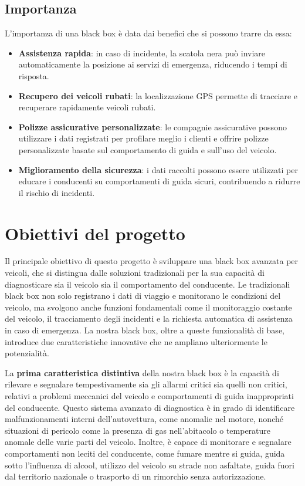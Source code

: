 \documentclass[12pt, a4paper, italian]{report}
\numberwithin{figure}{chapter}
\numberwithin{table}{chapter}
\begin{document}
\subsection{Importanza}
L'importanza di una black box è data dai benefici che si possono trarre da essa: 
\begin{itemize}
    \item \textbf{Assistenza rapida}: in caso di incidente, la scatola nera può inviare automaticamente la posizione ai servizi di emergenza, riducendo i tempi di risposta.
    \item \textbf{Recupero dei veicoli rubati}: la localizzazione GPS permette di tracciare e recuperare rapidamente veicoli rubati.
    \item \textbf{Polizze assicurative personalizzate}: le compagnie assicurative possono utilizzare i dati registrati per profilare meglio i clienti e offrire polizze personalizzate basate sul comportamento di guida e sull'uso del veicolo.
    \item \textbf{Miglioramento della sicurezza}: i dati raccolti possono essere utilizzati per educare i conducenti su comportamenti di guida sicuri, contribuendo a ridurre il rischio di incidenti.
\end{itemize}
\section{Obiettivi del progetto}
Il principale obiettivo di questo progetto è sviluppare una black box avanzata per veicoli, che si distingua dalle soluzioni tradizionali per la sua capacità di diagnosticare sia il veicolo sia il comportamento del conducente. Le tradizionali black box non solo registrano i dati di viaggio e monitorano le condizioni del veicolo, ma svolgono anche funzioni fondamentali come il monitoraggio costante del veicolo, il tracciamento degli incidenti e la richiesta automatica di assistenza in caso di emergenza. La nostra black box, oltre a queste funzionalità di base, introduce due caratteristiche innovative che ne ampliano ulteriormente le potenzialità.

La \textbf{prima caratteristica distintiva} della nostra black box è la capacità di rilevare e segnalare tempestivamente sia gli allarmi critici sia quelli non critici, relativi a problemi meccanici del veicolo e comportamenti di guida inappropriati del conducente. Questo sistema avanzato di diagnostica è in grado di identificare malfunzionamenti interni dell’autovettura, come anomalie nel motore, nonché situazioni di pericolo come la presenza di gas nell'abitacolo o temperature anomale delle varie parti del veicolo. Inoltre, è capace di monitorare e segnalare comportamenti non leciti del conducente, come fumare mentre si guida, guida sotto l'influenza di alcool, utilizzo del veicolo su strade non asfaltate, guida fuori dal territorio nazionale o trasporto di un rimorchio senza autorizzazione.
\end{document}
